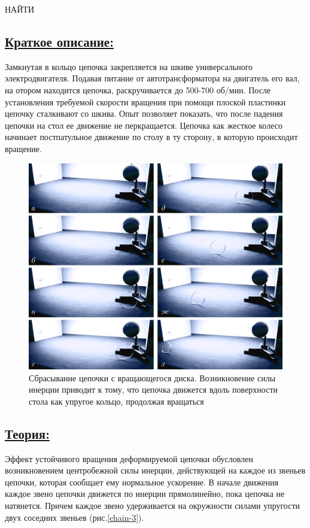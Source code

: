 \documentclass[14pt,a4paper,twoside]{extarticle}	%
\begin{document}
		НАЙТИ
		
		\subsection*{\underline{Краткое описание:}}
				
		Замкнутая в кольцо цепочка закрепляется на шкиве универсального электродвигателя.
		Подавая питание от автотрансформатора на двигатель его вал, на отором находится цепочка, раскручивается до 500-700 об/мин.
После установления требуемой скорости вращения при помощи плоской пластинки цепочку сталкивают со шкива.
Опыт позволяет показать, что после падения цепочки на стол ее движение не перкращается.
Цепочка как жесткое колесо начинает постпатульное движение по столу в ту сторону, в которую происходит вращение.

	\begin{figure}[H] 	
	\centering 	
	\includegraphics[width=0.9\linewidth]{chain-2.png}
	\caption{Сбрасывание цепочки с вращающегося диска. Возникновение силы инерции приводит к тому, что цепочка движется вдоль поверхности стола как упругое кольцо, продолжая вращаться}
	\label{chain-2}
\end{figure}
		
	\subsection*{\underline{Теория:}}
		
Эффект устойчивого вращения деформируемой цепочки обусловлен возникновением центробежной силы инерции, действующей на каждое из звеньев цепочки, которая сообщает ему нормальное ускорение.
В начале движения каждое звено цепочки движется по инерции прямолинейно, пока цепочка не натянется.
Причем каждое звено удерживается на окружности силами упругости двух соседних звеньев (рис.\ref{chain-3}).
		
\end{document}
